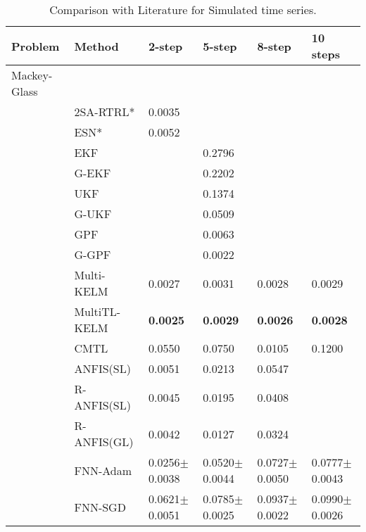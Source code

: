 \documentclass{ieeeaccess}
\begin{document}
 
\begin{table*}[htbp!]

\centering
 \small
 \caption{Comparison with Literature for Simulated time series. }
  
\label{tab:Simulated}
\begin{tabular}{llllll}

\hline
Problem & Method & 2-step & 5-step & 8-step & 10 steps\\
 \hline
 \hline
Mackey-Glass & &  	   &	& &\\
 


 &2SA-RTRL* \cite{chang2012reinforced}&  0.0035  	  &	 & & \\



 &ESN*\cite{chang2012reinforced}&    0.0052	&   	&   &\\
 &EKF\cite{Wu2013AMC}&     	&   0.2796	 &   &\\
 &G-EKF \cite{Wu2013AMC}&     	&   0.2202	 &   &\\
  &UKF \cite{Wu2013AMC}&     	&   	 0.1374&   &\\
  &G-UKF \cite{Wu2013AMC}&     	&   	0.0509&  & \\
 &GPF\cite{Wu2013AMC} &     	&   	0.0063&   &\\

 &G-GPF\cite{Wu2013AMC} &     	&   0.0022	&   &\\

&Multi-KELM\cite{YE2019227} &		0.0027&0.0031&0.0028&0.0029\\
&MultiTL-KELM\cite{YE2019227} &	\textbf{0.0025}&	\textbf{0.0029}&\textbf{0.0026}&\textbf{0.0028}\\
&CMTL \cite{chandra2017CMTLMulti}&  0.0550 & 	0.0750 & 0.0105 & 0.1200	\\





&ANFIS(SL) \cite{ZHOU2019343} &0.0051 &0.0213 & 0.0547 & \\
&R-ANFIS(SL) \cite{ZHOU2019343}&0.0045 &0.0195  &	0.0408 & \\
&R-ANFIS(GL) \cite{ZHOU2019343}&0.0042 & 	0.0127 & 0.0324 & \\

&FNN-Adam &   0.0256$\pm$	0.0038   	&   0.0520$\pm$	0.0044     &0.0727$\pm$	0.0050	       &0.0777$\pm$	0.0043\\

&FNN-SGD  &     0.0621$\pm$	0.0051 	&  0.0785$\pm$	0.0025       &0.0937$\pm$	0.0022	      &0.0990$\pm$	0.0026\\


\end{tabular}
\end{table*}
\end{document}
